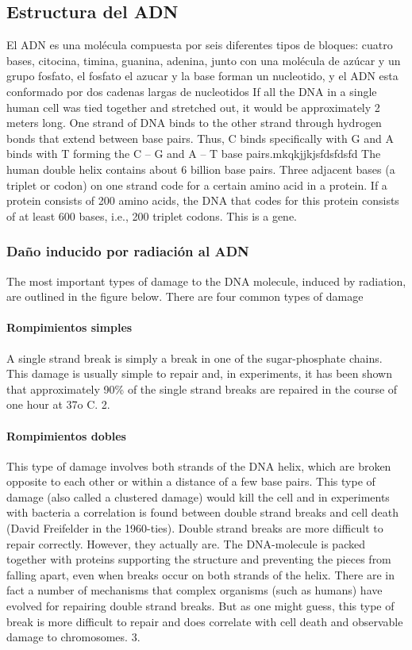 \subsection{Estructura del ADN}
El ADN es una molécula compuesta por seis diferentes tipos de bloques: cuatro bases, citocina, timina, guanina, adenina, junto con una molécula de azúcar y un grupo fosfato, el fosfato el azucar y la base forman un nucleotido, y el ADN esta conformado por dos cadenas largas de nucleotidos
If all the DNA in a single human cell was tied together and stretched out, it would be approximately 2 meters long. One strand of DNA binds to the other strand through hydrogen bonds that extend between base pairs. Thus, C binds specifically with G and A binds with T forming the C – G and A – T base pairs.mkqkjjkjsfdsfdsfd
The human double helix contains about 6 billion base pairs. Three adjacent bases (a triplet or codon) on one strand code for a certain amino acid in a protein. If a protein consists of 200 amino acids, the DNA that codes for this protein consists of at least 600 bases, i.e., 200 triplet codons. This is a gene.

\subsubsection{Daño inducido por radiación al ADN}
The most important types of damage to the DNA molecule, induced by radiation, are outlined in the figure below. There are four common types of damage
\paragraph{Rompimientos simples}
A single strand break is simply a break in one of the sugar-phosphate chains. This damage is usually simple to repair and, in experiments, it has been shown that approximately 90\% of the single strand breaks are repaired in the course of one hour at 37o
C. 2.
\paragraph{Rompimientos dobles}
This type of damage involves both strands of the DNA helix, which are broken opposite to each other or within a distance of a few base pairs. This type of damage (also called a clustered damage) would kill the cell and in experiments with bacteria a correlation is found between double strand breaks and cell death (David Freifelder in the 1960-ties).
Double strand breaks are more difficult to repair correctly. However, they actually are. The DNA-molecule is packed together with proteins supporting the structure and preventing the pieces from falling apart, even when breaks occur on both strands of the helix. There are in fact a number of mechanisms that complex organisms (such as humans) have evolved for repairing double strand breaks. But as one might guess, this type of break is more difficult to repair and does correlate with cell death and observable damage to chromosomes.
3.
